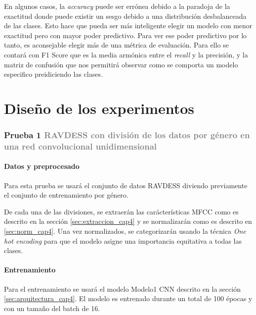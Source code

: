 \documentclass[11pt,a4paper,spanish]{book}
\begin{document}
	En algunos casos, la \emph{accuracy} puede ser errónea debido a la paradoja de la exactitud donde puede existir un sesgo debido a una distribución desbalanceada de las clases. Esto hace que pueda ser más inteligente elegir un modelo con menor exactitud pero con mayor poder predictivo.
	Para ver ese poder predictivo por lo tanto, es aconsejable elegir más de una métrica de evaluación. Para ello se contará con F1 Score que es la media armónica entre el \emph{recall} y la precisión, y la matriz de confusión que nos permitirá observar como se comporta un modelo especifico preidiciendo las clases.
	
	
	\section{Diseño de los experimentos}
	\subsubsection[]{\Large Prueba 1 {\normalsize \textcolor{Gray}{RAVDESS con división de los datos por género en una red convolucional unidimensional}}}
	
	\hfill\begin{minipage}{\dimexpr\textwidth-1cm}
		\paragraph{Datos y preprocesado}
		Para esta prueba se usará el conjunto de datos RAVDESS diviendo previamente el conjunto de entrenamiento por género. 
		
		De cada una de las divisiones, se extraerán las carácterísticas MFCC como es descrito en la sección \ref{sec:extraccion_cap4} y se normalizarán como es descrito en \ref{sec:norm_cap4}. Una vez normalizados, se categorizarán usando la técnica \emph{One hot encoding} para que el modelo asigne una importancia equitativa a todas las clases.
		
		\paragraph{Entrenamiento}
		Para el entrenamiento se usará el modelo Modelo1 CNN descrito en la sección \ref{sec:arquitectura_cap4}. El modelo es entrenado durante un total de 100 épocas y con un tamaño del batch de 16.
	\end{minipage}
	
\end{document}
